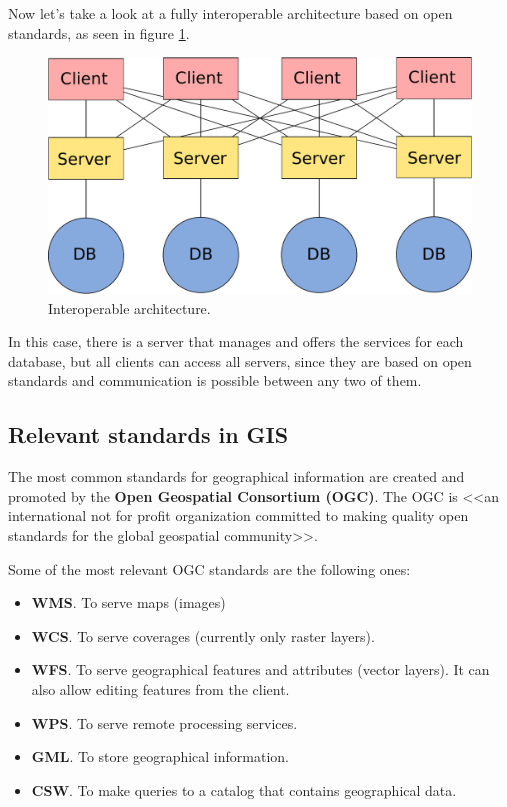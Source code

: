 Now let's take a look at a fully interoperable architecture based on open standards, as seen in figure \ref{Fig:Interoperable}.

\begin{figure}[!hbt]   
\centering
\includegraphics[width=.7\columnwidth]{Software/Interoperable.pdf}
\caption{\small Interoperable architecture.}
\label{Fig:Interoperable} 
\end{figure}

In this case, there is a server that manages and offers the services for each database, but all clients can access all servers, since they are based on open standards and communication is possible between any two of them.

\subsection{Relevant standards in GIS}

The most common standards for geographical information are created and promoted by the  \textbf{Open Geospatial Consortium (OGC)}. The OGC is <<an international not for profit organization committed to making quality open standards for the global geospatial community>>.

Some of the most relevant OGC standards are the following ones:

\begin{itemize}
\item \textbf{WMS}. To serve maps (images)
\item \textbf{WCS}. To serve coverages (currently only raster layers).
\item \textbf{WFS}. To serve geographical features and attributes (vector layers). It can also allow editing features from the client.
\item \textbf{WPS}. To serve remote processing services.
\item \textbf{GML}. To store geographical information.
\item \textbf{CSW}. To make queries to a catalog that contains geographical data.
\end{itemize}

